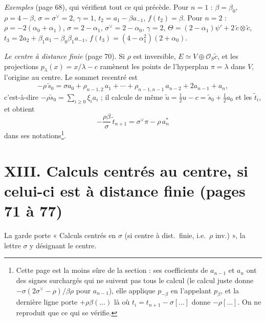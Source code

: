 \documentclass[11pt,a4paper]{article}
\begin{document}
\emph{Exemples} (page 68), qui vérifient tout ce qui précède. Pour $n = 1$ :
$\beta = \beta_0$, $\rho = 4 - \beta$, $\sigma = \sigma^\vee = 2$, $\gamma = 1$,
$t_2 = a_1 - \beta a_{-1}$, $f(t_2) = \beta$. Pour $n = 2$ : $\rho = -2(\alpha_0
+ \alpha_1)$, $\sigma = 2 - \alpha_1$, $\sigma^\vee = 2 - \alpha_0$, $\gamma = 2$,
$\Theta = (2 - \alpha_1)\psi' + 2\,\tilde c \otimes \tilde c$, $t_3 = 2a_2 +
\beta_1 a_1 - \beta_0\beta_1 a_{-1}$, $f(t_3) = (4 - \alpha_1^2)(2 + \alpha_0)$.

\emph{Le centre à distance finie} (page 70). Si $\rho$ est inversible, $E
\simeq V \oplus \mathcal{O}_S \tilde c$, et les projections $p_\lambda(x) = x/\lambda
- c$ ramènent les points de l'hyperplan $\pi = \lambda$ dans $V$, l'origine au
centre. Le sommet recentré est
\[
-\rho\,\tilde s_0 = \sigma a_0 + \rho_{n-1,2}\, a_1 + \cdots + \rho_{n-1,n-1}\,
a_{n-2} + 2a_{n-1} + a_n ,
\]
c'est-à-dire $-\rho\tilde s_0 = \sum_{i \geqslant 0}\xi_i a_i$ ; il calcule
de même $\tilde u = \tfrac12 u - c = \tilde s_0 + \tfrac12 a_0$ et les
$\tilde t_i$, et obtient
\[
-\frac{\rho\beta}{\sigma}\,\tilde t_{n+1} = \sigma^\vee \pi - \rho\, a^*_n
\]
dans ses notations\footnote{Cette page est la moins sûre de la section : ses
coefficients de $a_{n-1}$ et $a_n$ ont des signes surchargés qui ne suivent pas
tous le calcul (le calcul juste donne $-\sigma(2\sigma^\vee - \rho)/\beta\rho$
pour $a_{n-1}$), elle applique $p_{-\beta}$ en l'appelant $p_\beta$, et la
dernière ligne porte $+\rho\beta(\ldots)$ là où $t_i = t_{n+1} - \sigma[\ldots]$
donne $-\rho[\ldots]$. On ne reproduit que ce qui se vérifie.}.

\section*{XIII. Calculs centrés au centre, si celui-ci est à distance finie (pages 71 à 77)}

La garde porte « Calculs centrés en $\sigma$ (si centre à dist.\ finie, i.e.\
$\rho$ inv.) », la lettre $\sigma$ y désignant le centre.
\end{document}
